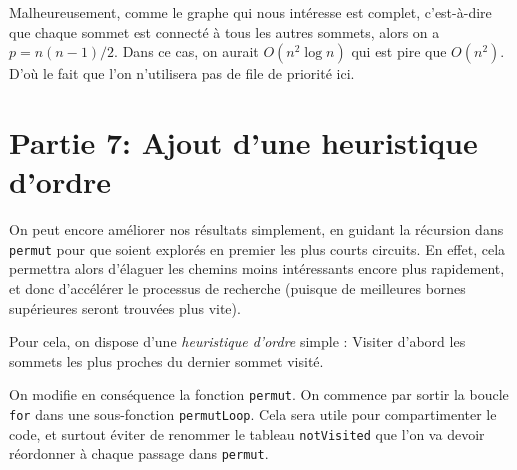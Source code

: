 Malheureusement, comme le graphe qui nous intéresse est complet, c'est-à-dire que chaque sommet est connecté à tous les autres sommets, alors on a $p = n(n - 1)/2$. Dans ce cas, on aurait $O(n^2 \log n)$ qui est pire que $O(n^2)$. D'où le fait que l'on n'utilisera pas de file de priorité ici.

\section{Partie 7: Ajout d'une heuristique d'ordre}

On peut encore améliorer nos résultats simplement, en guidant la récursion dans \texttt{permut} pour que soient explorés en premier les plus courts circuits. En effet, cela permettra alors d'élaguer les chemins moins intéressants encore plus rapidement, et donc d'accélérer le processus de recherche (puisque de meilleures bornes supérieures seront trouvées plus vite).

Pour cela, on dispose d'une \textit{heuristique d'ordre} simple : Visiter d'abord les sommets les plus proches du dernier sommet visité.

On modifie en conséquence la fonction \texttt{permut}. On commence par sortir la boucle \texttt{for} dans une sous-fonction \texttt{permutLoop}. Cela sera utile pour compartimenter le code, et surtout éviter de renommer le tableau \texttt{notVisited} que l'on va devoir réordonner à chaque passage dans \texttt{permut}.

